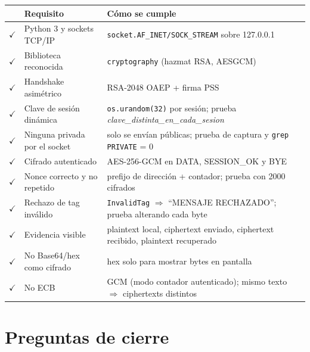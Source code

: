 \documentclass[11pt,a4paper]{article}
\newcommand{\ok}{\textcolor{green!50!black}{$\checkmark$}}
\begin{document}
\begin{center}
\begin{tabularx}{\linewidth}{@{}cX X@{}}
\toprule
 & \textbf{Requisito} & \textbf{Cómo se cumple} \\ \midrule
\ok & Python 3 y sockets TCP/IP & \texttt{socket.AF\_INET/SOCK\_STREAM} sobre 127.0.0.1 \\
\ok & Biblioteca reconocida & \texttt{cryptography} (hazmat RSA, AESGCM) \\
\ok & Handshake asimétrico & RSA-2048 OAEP + firma PSS \\
\ok & Clave de sesión dinámica & \texttt{os.urandom(32)} por sesión; prueba \emph{clave\_distinta\_en\_cada\_sesion} \\
\ok & Ninguna privada por el socket & solo se envían públicas; prueba de captura y \texttt{grep PRIVATE} = 0 \\
\ok & Cifrado autenticado & AES-256-GCM en DATA, SESSION\_OK y BYE \\
\ok & Nonce correcto y no repetido & prefijo de dirección + contador; prueba con 2000 cifrados \\
\ok & Rechazo de tag inválido & \texttt{InvalidTag} $\Rightarrow$ ``MENSAJE RECHAZADO''; prueba alterando cada byte \\
\ok & Evidencia visible & plaintext local, ciphertext enviado, ciphertext recibido, plaintext recuperado \\
\ok & No Base64/hex como cifrado & hex solo para mostrar bytes en pantalla \\
\ok & No ECB & GCM (modo contador autenticado); mismo texto $\Rightarrow$ ciphertexts distintos \\
\bottomrule
\end{tabularx}
\end{center}

\section{Preguntas de cierre}
\end{document}
